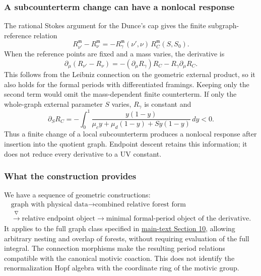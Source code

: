 \documentclass[11pt,a4paper,oneside]{article}
\theoremstyle{plain}
\theoremstyle{definition}
\theoremstyle{remark}
\numberwithin{equation}{section}
\newcommand{\otherref}[2]{\href{#1.pdf}{#2}}
\begin{document}
\subsubsection{A subcounterterm change can have a nonlocal response}
The rational Stokes argument for the Dunce's cap gives the finite subgraph-reference relation
\begin{equation}\label{descent:eq:scheme}
 R_{\nu'}^{\mathfrak m}-R_\nu^{\mathfrak m}
   =-R_\gamma^{\mathfrak m}(\nu',\nu)\,
                         R_C^{\mathfrak m}(S,S_0).
\end{equation}
When the reference points are fixed and a mass varies, the derivative is
\begin{equation}\label{descent:eq:schemederivative}
 \partial_\mu(R_{\nu'}-R_\nu)
 =-(\partial_\mu R_\gamma)R_C
                        -R_\gamma\partial_\mu R_C.
\end{equation}
This follows from the Leibniz connection on the geometric external product, so it also holds for the formal periods with differentiated framings. Keeping only the second term would omit the mass-dependent finite counterterm. If only the whole-graph external parameter $S$ varies, $R_\gamma$ is constant and
\[
 \partial_SR_C=-\int_0^1
       \frac{y(1-y)}{\mu_cy+\mu_d(1-y)+S y(1-y)}\,dy<0.
\]
Thus a finite change of a local subcounterterm produces a nonlocal response after insertion into the quotient graph. Endpoint descent retains this information; it does not reduce every derivative to a UV constant.

\subsubsection{What the construction provides}
We have a sequence of geometric constructions:
\[
 \begin{gathered}
 \text{graph with physical data}
 \longrightarrow\text{combined relative forest form}\\
 \xrightarrow{\nabla}\text{relative endpoint object}
 \longrightarrow\text{minimal formal-period object of the derivative}.
 \end{gathered}
\]
It applies to the full graph class specified in \otherref{feynman_periods_long_paper_en}{main-text Section 10}, allowing arbitrary nesting and overlap of forests, without requiring evaluation of the full integral. The connection morphisms make the resulting period relations compatible with the canonical motivic coaction. This does not identify the renormalization Hopf algebra with the coordinate ring of the motivic group.
\end{document}
